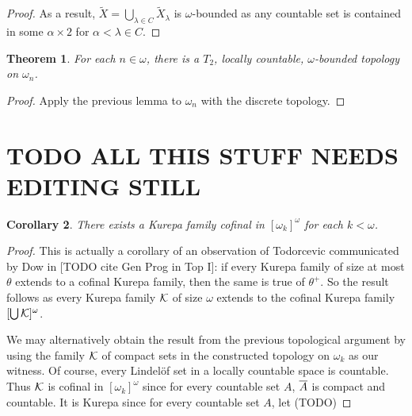 \documentclass{amsart}
\theoremstyle{plain}
\newtheorem{theorem}{Theorem}
\newtheorem{corollary}[theorem]{Corollary}
\theoremstyle{definition}
\theoremstyle{remark}
\theoremstyle{plain}
\theoremstyle{definition}
\theoremstyle{remark}
\begin{document}
\begin{proof}
    As a result, \(\tilde X=\bigcup_{\lambda\in C}\tilde X_\lambda\)
    is
    \(\omega\)-bounded as any countable set is contained in some
    \(\alpha\times 2\) for \(\alpha<\lambda\in C\).
  \end{proof}

  \begin{theorem}
    For each $n\in \omega$, there is a \(T_2\), locally countable,
    $\omega$-bounded topology on $\omega_n$.
  \end{theorem}

  \begin{proof}
    Apply the previous lemma to \(\omega_n\) with the discrete topology.
  \end{proof}















  \newpage

  \section{TODO ALL THIS STUFF NEEDS EDITING STILL}








  \begin{corollary}
    There exists a Kurepa family cofinal in \([\omega_k]^\omega\)
    for each \(k<\omega\).
  \end{corollary}

  \begin{proof}
    This is actually a corollary of an observation of Todorcevic communicated
    by Dow in [TODO cite Gen Prog in Top I]:
    if every Kurepa family of size at most \(\theta\)
    extends to a cofinal Kurepa family, then the same is true of \(\theta^+\).
    So the result follows as
    every Kurepa family \(\mathcal{K}\) of size \(\omega\) extends to
    the cofinal Kurepa family \([\bigcup\mathcal{K}]^\omega\).

    We may alternatively
    obtain the result from the previous topological argument by using the family
    \(\mathcal{K}\) of compact sets in the constructed topology on
    \(\omega_k\) as our witness. Of course, every Lindel\"of set in
    a locally countable space is countable. Thus \(\mathcal{K}\)
    is cofinal in \([\omega_k]^\omega\)
    since for every countable set \(A\), \(\overline{A}\) is compact and countable.
    It is Kurepa since for every countable set \(A\), let (TODO)
  \end{proof}
\end{document}
